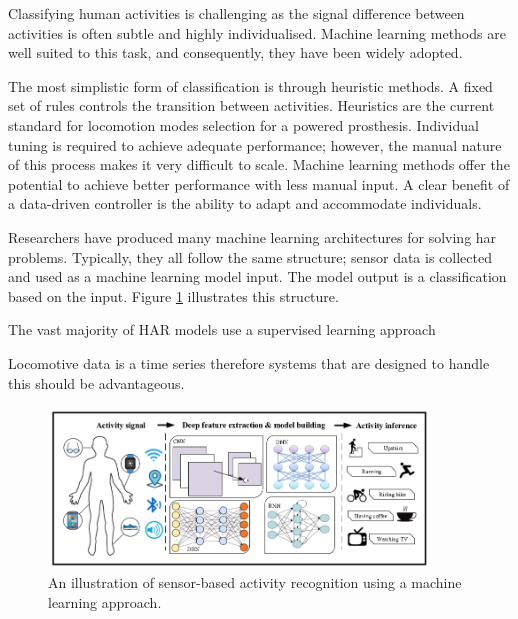 Classifying human activities is challenging as the signal difference between activities is often subtle and highly individualised\cite{Zhu2019}. Machine learning methods are well suited to this task, and consequently, they have been widely adopted\cite{Wang2019b}.

The most simplistic form of classification is through heuristic methods. A fixed set of rules controls the transition between activities. Heuristics are the current standard for locomotion modes selection for a powered prosthesis\cite{Lawson2014, Gorsic2014, Varol2008}. Individual tuning is required to achieve adequate performance; however, the manual nature of this process makes it very difficult to scale\cite{Tucker2015}. Machine learning methods offer the potential to achieve better performance with less manual input\cite{Zhu2019}. A clear benefit of a data-driven controller is the ability to adapt and accommodate individuals.\cite{Rai2019a}

Researchers have produced many machine learning architectures for solving \acrshort{har} problems. Typically, they all follow the same structure; sensor data is collected and used as a machine learning model input. The model output is a classification based on the input. Figure \ref{fig:back-sensor-based-deep-learning} illustrates this structure.\cite{Wang2019b}

The vast majority of HAR models use a supervised learning approach

Locomotive data is a time series therefore systems that are designed to handle this should be advantageous.

\begin{figure}
    \centering
    \includegraphics[width=0.9\textwidth]{content/2-Background/sensor-based-deep-learning.png}
    \caption[An illustration of sensor-based activity recognition using a machine learning approach]{An illustration of sensor-based activity recognition using a machine learning approach\cite{Wang2019b}.}
    \label{fig:back-sensor-based-deep-learning}
\end{figure}


